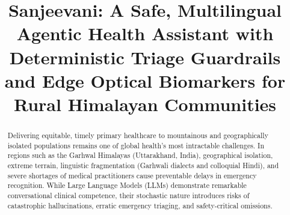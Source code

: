 \documentclass[conference]{IEEEtran}
\begin{document}
\title{Sanjeevani: A Safe, Multilingual Agentic Health Assistant with Deterministic Triage Guardrails and Edge Optical Biomarkers for Rural Himalayan Communities}

\author{
}

\maketitle

\begin{abstract}
Delivering equitable, timely primary healthcare to mountainous and geographically isolated populations remains one of global health's most intractable challenges. In regions such as the Garhwal Himalayas (Uttarakhand, India), geographical isolation, extreme terrain, linguistic fragmentation (Garhwali dialects and colloquial Hindi), and severe shortages of medical practitioners cause preventable delays in emergency recognition. While Large Language Models (LLMs) demonstrate remarkable conversational clinical competence, their stochastic nature introduces risks of catastrophic hallucinations, erratic emergency triaging, and safety-critical omissions. 


\end{abstract}
\end{document}
